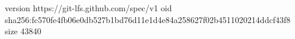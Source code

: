 version https://git-lfs.github.com/spec/v1
oid sha256:fc570fe4fb06e0db527b1bd76d11e1d4e84a258627f02b4511020214ddcf43f8
size 43840

